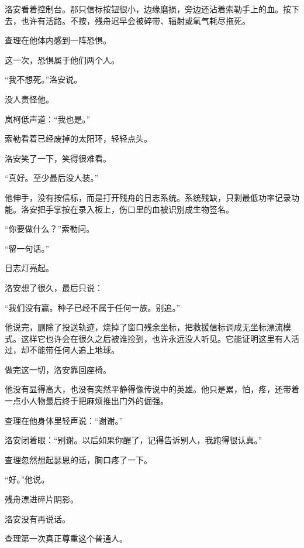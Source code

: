 洛安看着控制台。那只信标按钮很小，边缘磨损，旁边还沾着索勒手上的血。按下去，也许有活路。不按，残舟迟早会被碎带、辐射或氧气耗尽拖死。

查理在他体内感到一阵恐惧。

这一次，恐惧属于他们两个人。

“我不想死。”洛安说。

没人责怪他。

岚柯低声道：“我也是。”

索勒看着已经废掉的太阳环，轻轻点头。

洛安笑了一下，笑得很难看。

“真好。至少最后没人装。”

他伸手，没有按信标，而是打开残舟的日志系统。系统残缺，只剩最低功率记录功能。洛安把手掌按在录入板上，伤口里的血被识别成生物签名。

“你要做什么？”索勒问。

“留一句话。”

日志灯亮起。

洛安想了很久，最后只说：

“我们没有赢。种子已经不属于任何一族。别追。”

他说完，删除了投送轨迹，烧掉了窗口残余坐标，把救援信标调成无坐标漂流模式。这样它也许会在很久之后被谁捡到，也许永远没人听见。它能证明这里有人活过，却不能带任何人追上地球。

做完这一切，洛安靠回座椅。

他没有显得高大，也没有突然平静得像传说中的英雄。他只是累，怕，疼，还带着一点小人物最后终于把麻烦推出门外的倔强。

查理在他身体里轻声说：“谢谢。”

洛安闭着眼：“别谢。以后如果你醒了，记得告诉别人，我跑得很认真。”

查理忽然想起瑟恩的话，胸口疼了一下。

“好。”他说。

残舟漂进碎片阴影。

洛安没有再说话。

查理第一次真正尊重这个普通人。

